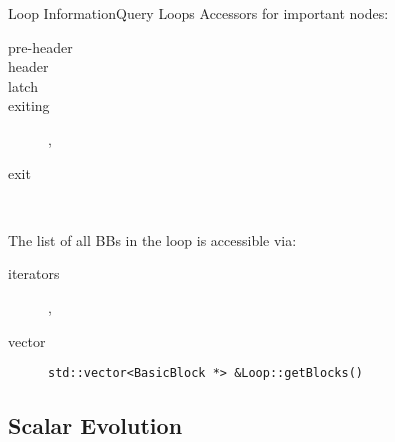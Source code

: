 \begin{frame}{Loop Information}{Query Loops}
Accessors for important nodes:

\begin{description}
\item[pre-header] 
\item[header] 
\item[latch] 
\item[exiting] , \\
\item[exit]  \\
\end{description}

\vfill
The list of all BBs in the loop is accessible via:

\begin{description}
\item[iterators] , \\
\item[vector]
      \texttt{std::vector<BasicBlock *> \&Loop::getBlocks()}
\end{description}
\end{frame}


\subsection{Scalar Evolution}


